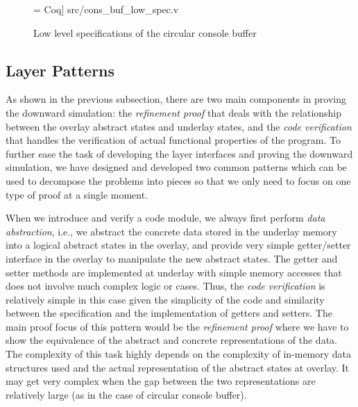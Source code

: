 
\begin{figure}
 = Coq] {src/cons_buf_low_spec.v}
\caption{Low level specifications of the circular console buffer}
\label{fig:cons_buf_low_spec}
\end{figure}


\subsection{Layer Patterns}
As shown in the previous subsection, there are two main components in proving the
downward simulation: the {\it refinement proof} that deals with the relationship
between the overlay abstract states and underlay states, and the {\it code verification}
that handles the verification of actual functional properties of the program.
To further ease the task of developing the layer interfaces and proving the
downward simulation, we have designed and developed two common patterns which
can be used to decompose the problems into pieces so that we only need to focus
on one type of proof at a single moment.

When we introduce and verify a code module, we always first perform {\it data abstraction},
i.e., we abstract the concrete data stored in the underlay memory into a logical
abstract states in the overlay, and provide very simple getter/setter interface in
the overlay to manipulate the new abstract states. The getter and setter methods
are implemented at underlay with simple memory accesses that does not involve much
complex logic or cases. Thus, the {\it code verification} is relatively simple in this case
given the simplicity of the code and similarity between the specification and the
implementation of getters and setters. The main proof focus of this pattern would
be the {\it refinement proof} where we have to show the equivalence of the abstract
and concrete representations of the data. The complexity of this task highly depends
on the complexity of in-memory data structures used and the actual representation
of the abstract states at overlay. It may get very complex when the gap between 
the two representations are relatively large (as in the case of circular console buffer).

